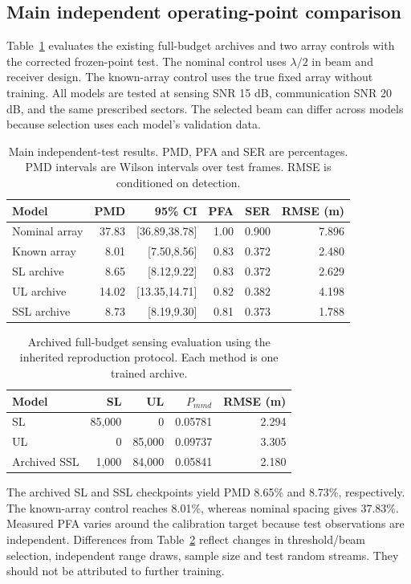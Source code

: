 \documentclass[conference]{IEEEtran}
\begin{document}
\subsection{Main independent operating-point comparison}
Table~\ref{tab:main-final} evaluates the existing full-budget archives and two array controls with the corrected frozen-point test. The nominal control uses $\lambda/2$ in beam and receiver design. The known-array control uses the true fixed array without training. All models are tested at sensing SNR 15 dB, communication SNR 20 dB, and the same prescribed sectors. The selected beam can differ across models because selection uses each model's validation data.
\begin{table}[t]\centering\small
\caption{Main independent-test results. PMD, PFA and SER are percentages. PMD intervals are Wilson intervals over test frames. RMSE is conditioned on detection.}\label{tab:main-final}
\setlength{\tabcolsep}{3pt}
\begin{tabular}{lrrrrr}\toprule
Model & PMD & 95\% CI & PFA & SER & RMSE (m)\\\midrule
Nominal array & 37.83 & [36.89,38.78] & 1.00 & 0.900 & 7.896\\
Known array & 8.01 & [7.50,8.56] & 0.83 & 0.372 & 2.480\\
SL archive & 8.65 & [8.12,9.22] & 0.83 & 0.372 & 2.629\\
UL archive & 14.02 & [13.35,14.71] & 0.82 & 0.382 & 4.198\\
SSL archive & 8.73 & [8.19,9.30] & 0.81 & 0.373 & 1.788\\
\bottomrule\end{tabular}
\end{table}
\begin{table}[t]\centering\small
\caption{Archived full-budget sensing evaluation using the inherited reproduction protocol. Each method is one trained archive.}\label{tab:legacy-final}
\setlength{\tabcolsep}{3pt}
\begin{tabular}{lrrrr}\toprule
Model & SL & UL & $P_{
m md}$ & RMSE (m)\\\midrule
SL & 85,000 & 0 & 0.05781 & 2.294\\
UL & 0 & 85,000 & 0.09737 & 3.305\\
Archived SSL & 1,000 & 84,000 & 0.05841 & 2.180\\
\bottomrule\end{tabular}
\end{table}

The archived SL and SSL checkpoints yield PMD 8.65\% and 8.73\%, respectively. The known-array control reaches 8.01\%, whereas nominal spacing gives 37.83\%. Measured PFA varies around the calibration target because test observations are independent. Differences from Table~\ref{tab:legacy-final} reflect changes in threshold/beam selection, independent range draws, sample size and test random streams. They should not be attributed to further training.
\end{document}
